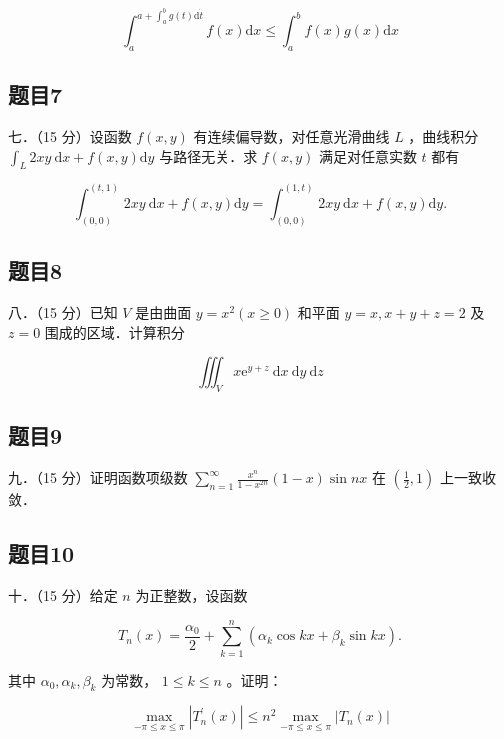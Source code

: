 \documentclass{article}
\begin{document}
\[
\int_{a}^{a+\int_{a}^{b} g(t) \mathrm{d} \dot{t}} f(x) \mathrm{d} x \leq \int_{a}^{b} f(x) g(x) \mathrm{d} x
\]

\subsection{题目7}
七．（15 分）设函数 \(f(x, y)\) 有连续偏导数，对任意光滑曲线 \(L\) ，曲线积分 \(\int_{L} 2 x y \mathrm{~d} x+f(x, y) \mathrm{d} y\) 与路径无关．求 \(f(x, y)\) 满足对任意实数 \(t\) 都有

\[
\int_{(0,0)}^{(t, 1)} 2 x y \mathrm{~d} x+f(x, y) \mathrm{d} y=\int_{(0,0)}^{(1, t)} 2 x y \mathrm{~d} x+f(x, y) \mathrm{d} y .
\]

\subsection{题目8}
八．（15 分）已知 \(V\) 是由曲面 \(y=x^{2}(x \geq 0)\) 和平面 \(y=x, x+y+z=2\) 及 \(z=0\) 围成的区域．计算积分

\[
\iiint_{V} x \mathrm{e}^{y+z} \mathrm{~d} x \mathrm{~d} y \mathrm{~d} z
\]

\subsection{题目9}
九．（15 分）证明函数项级数 \(\sum_{n=1}^{\infty} \frac{x^{n}}{1-x^{2 n}}(1-x) \sin n x\) 在 \(\left(\frac{1}{2}, 1\right)\) 上一致收敛．

\subsection{题目10}
十．（15 分）给定 \(n\) 为正整数，设函数

\[
T_{n}(x)=\frac{\alpha_{0}}{2}+\sum_{k=1}^{n}\left(\alpha_{k} \cos k x+\beta_{k} \sin k x\right) .
\]

其中 \(\alpha_{0}, \alpha_{k}, \beta_{k}\) 为常数， \(1 \leq k \leq n\) 。证明：

\[
\max _{-\pi \leq x \leq \pi}\left|T_{n}^{\prime}(x)\right| \leq n^{2} \max _{-\pi \leq x \leq \pi}\left|T_{n}(x)\right|
\]
\end{document}

